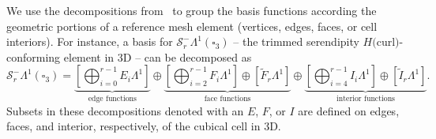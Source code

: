 \documentclass[format=acmsmall,screen,timestamp=false,a4paper]{acmart}
\newcommand{\calS}{\mathcal{S}}
\begin{document}
  
We use the decompositions from~\cite{gillette2019computational} to group the basis functions according the geometric portions of a reference mesh element (vertices, edges, faces, or cell interiors).  For instance, a basis for $\calS^-_r\Lambda^1(\square_3)$ -- the trimmed serendipity $H($curl$)$-conforming element in 3D -- can be decomposed as
   \begin{equation}\label{eq:HCurlTrimmedSerendipityBasis}
   \calS^-_r\Lambda^1(\square_3) =   \underbrace{\left[\bigoplus_{i=0}^{r-1} E_i \Lambda^1\right]}_{\text{edge functions}}\oplus\underbrace{\left[ \bigoplus_{i=2}^{r-1}F_i \Lambda^1\right] \oplus \left[\tilde{F}_r \Lambda^1\right]}_{\text{face functions}}\oplus\underbrace{\left[ \bigoplus_{i=4}^{r-1}I_i \Lambda^1 \right] \oplus \left[\tilde{I}_r \Lambda^1\right]}_{\text{interior functions}}.
   \end{equation}
  Subsets in these decompositions denoted with an $E$, $F$, or $I$ are defined on edges, faces, and interior, respectively, of the cubical cell in 3D.
  
  
\end{document}
